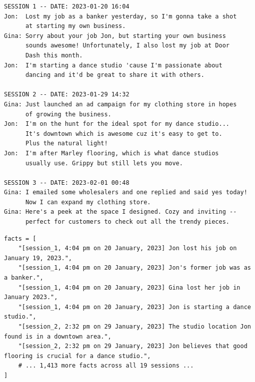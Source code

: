 \begin{lstlisting}[style=conversationstyle,caption={Verbatim excerpts from LOCOMO \texttt{conv-30} (Jon and Gina). Three sessions over twelve days.},label={lst:app-locomo-conv}]
SESSION 1 -- DATE: 2023-01-20 16:04
Jon:  Lost my job as a banker yesterday, so I'm gonna take a shot
      at starting my own business.
Gina: Sorry about your job Jon, but starting your own business
      sounds awesome! Unfortunately, I also lost my job at Door
      Dash this month.
Jon:  I'm starting a dance studio 'cause I'm passionate about
      dancing and it'd be great to share it with others.

SESSION 2 -- DATE: 2023-01-29 14:32
Gina: Just launched an ad campaign for my clothing store in hopes
      of growing the business.
Jon:  I'm on the hunt for the ideal spot for my dance studio...
      It's downtown which is awesome cuz it's easy to get to.
      Plus the natural light!
Jon:  I'm after Marley flooring, which is what dance studios
      usually use. Grippy but still lets you move.

SESSION 3 -- DATE: 2023-02-01 00:48
Gina: I emailed some wholesalers and one replied and said yes today!
      Now I can expand my clothing store.
Gina: Here's a peek at the space I designed. Cozy and inviting --
      perfect for customers to check out all the trendy pieces.
\end{lstlisting}
\vspace{-0.5em}
\begin{lstlisting}[caption={Phase~1 output -- append-only fact list, \emph{verbatim} from running our pipeline on \texttt{conv-30} (1{,}419 facts over the 19 sessions; six representative entries shown). Each entry is prefixed with its session and timestamp, and relative dates are resolved against that timestamp---``lost my job \dots yesterday'' (session~1, 20~Jan) becomes \texttt{January 19, 2023}.},label={lst:app-locomo-facts}]
facts = [
    "[session_1, 4:04 pm on 20 January, 2023] Jon lost his job on January 19, 2023.",
    "[session_1, 4:04 pm on 20 January, 2023] Jon's former job was as a banker.",
    "[session_1, 4:04 pm on 20 January, 2023] Gina lost her job in January 2023.",
    "[session_1, 4:04 pm on 20 January, 2023] Jon is starting a dance studio.",
    "[session_2, 2:32 pm on 29 January, 2023] The studio location Jon found is in a downtown area.",
    "[session_2, 2:32 pm on 29 January, 2023] Jon believes that good flooring is crucial for a dance studio.",
    # ... 1,413 more facts across all 19 sessions ...
]
\end{lstlisting}
